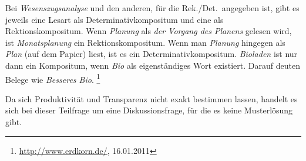 Bei \textit{Wesenszugsanalyse} und den anderen, für die Rek./Det.\ angegeben ist, gibt es jeweils eine Lesart als Determinativkompositum und eine als Rektionskompositum.
Wenn \zB \textit{Planung} als \textit{der Vorgang des Planens} gelesen wird, ist \textit{Monatsplanung} ein Rektionskompositum.
Wenn man \textit{Planung} hingegen als \textit{Plan} (\zB auf dem Papier) liest, ist es ein Determinativkompositum.
\textit{Bioladen} ist nur dann ein Kompositum, wenn \textit{Bio} als eigenständiges Wort existiert.
Darauf deuten Belege wie \textit{Besseres Bio}.%
\footnote{\raggedright{\url{http://www.erdkorn.de/}, 16.01.2011}}

\label{sol:wortbildung02}

Da sich Produktivität und Transparenz nicht exakt bestimmen lassen, handelt es sich bei dieser Teilfrage um eine Diskussionsfrage, für die es keine Musterlösung gibt.

\begin{center}
\end{center}

